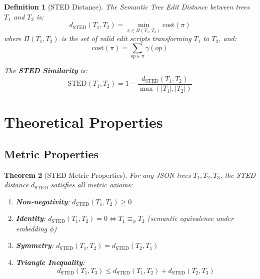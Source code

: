 \documentclass{article}
\newtheorem{theorem}{Theorem}
\newtheorem{definition}[theorem]{Definition}
\begin{document}
\begin{definition}[STED Distance]
\label{def:sted}
The Semantic Tree Edit Distance between trees $T_1$ and $T_2$ is:
\begin{equation}
    d_{\text{STED}}(T_1, T_2) = \min_{\pi \in \Pi(T_1, T_2)} \text{cost}(\pi)
\end{equation}
where $\Pi(T_1, T_2)$ is the set of valid edit scripts transforming $T_1$ to $T_2$, and:
\begin{equation}
    \text{cost}(\pi) = \sum_{op \in \pi} \gamma(op)
\end{equation}

The \textbf{STED Similarity} is:
\begin{equation}
    \text{STED}(T_1, T_2) = 1 - \frac{d_{\text{STED}}(T_1, T_2)}{\max(|T_1|, |T_2|)}
\end{equation}
\end{definition}

\section{Theoretical Properties}

\subsection{Metric Properties}

\begin{theorem}[STED Metric Properties]
\label{thm:metric}
For any JSON trees $T_1, T_2, T_3$, the STED distance $d_{\text{STED}}$ satisfies all metric axioms:
\begin{enumerate}
    \item[(i)] \textbf{Non-negativity}: $d_{\text{STED}}(T_1, T_2) \geq 0$
    \item[(ii)] \textbf{Identity}: $d_{\text{STED}}(T_1, T_2) = 0 \Leftrightarrow T_1 \equiv_{\phi} T_2$ (semantic equivalence under embedding $\phi$)
    \item[(iii)] \textbf{Symmetry}: $d_{\text{STED}}(T_1, T_2) = d_{\text{STED}}(T_2, T_1)$
    \item[(iv)] \textbf{Triangle Inequality}:
    \begin{equation}
        d_{\text{STED}}(T_1, T_3) \leq d_{\text{STED}}(T_1, T_2) + d_{\text{STED}}(T_2, T_3)
    \end{equation}
\end{enumerate}
\end{theorem}
\end{document}
